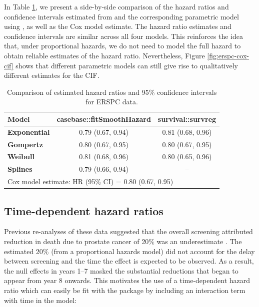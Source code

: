 \documentclass[
]{jss}
\begin{document}
In Table \ref{tab:print-erspc-estimates}, we present a side-by-side
comparison of the hazard ratios and confidence intervals estimated from
 and the corresponding parametric model using
, as well as the Cox model estimate. The hazard
ratio estimates and confidence intervals are similar across all four
models. This reinforces the idea that, under proportional hazards, we do
not need to model the full hazard to obtain reliable estimates of the
hazard ratio. Nevertheless, Figure \ref{fig:erspc-cox-cif} shows that
different parametric models can still give rise to qualitatively
different estimates for the CIF.

\begin{CodeChunk}
\begin{table}

\caption{\label{tab:print-erspc-estimates}Comparison of estimated hazard ratios and 95\% confidence intervals for ERSPC data.}
\centering
\begin{tabular}[t]{>{}lcc}
\toprule
Model & casebase::fitSmoothHazard & survival::survreg\\
\midrule
\textbf{Exponential} & 0.79 (0.67, 0.94) & 0.81 (0.68, 0.96)\\
\cmidrule{1-3}
\textbf{Gompertz} & 0.80 (0.67, 0.95) & 0.80 (0.67, 0.95)\\
\cmidrule{1-3}
\textbf{Weibull} & 0.81 (0.68, 0.96) & 0.80 (0.65, 0.96)\\
\cmidrule{1-3}
\textbf{Splines} & 0.79 (0.66, 0.94) & --\\
\bottomrule
\multicolumn{3}{l}{\rule{0pt}{1em}Cox model estimate: HR (95\% CI) = 0.80 (0.67, 0.95)}\\
\end{tabular}
\end{table}

\end{CodeChunk}

\subsection{Time-dependent hazard ratios}

Previous re-analyses of these data suggested that the overall screening
attributed reduction in death due to prostate cancer of 20\% was an
underestimate \citep{hanley2010mortality}. The estimated 20\% (from a
proportional hazards model) did not account for the delay between
screening and the time the effect is expected to be observed. As a
result, the null effects in years 1--7 masked the substantial reductions
that began to appear from year 8 onwards. This motivates the use of a
time-dependent hazard ratio which can easily be fit with the
 package by including an interaction term with time in the
model:
\end{document}

